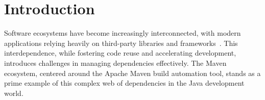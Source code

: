\documentclass[conference]{IEEEtran}
\begin{document}




\maketitle

\begin{abstract}
Regular dependency updates protect dependent software components from upstream bugs, security vulnerabilities, and poor code quality. Measures of dependency updates across software ecosystems involve two key dimensions: the time span during which a release is being newly adopted (adoption lifespan) and the extent of adoption across the ecosystem (adoption reach). We examine correlations between adoption patterns in the Maven software ecosystem and two factors: the magnitude of code modifications (extent of modifications affecting the meaning or behavior of the code, henceforth called ``semantic change") in an upstream dependency and the relative maintenance rate of upstream packages. Using the Goblin Weaver framework, we find adoption latency in the Maven ecosystem follows a log-normal distribution while adoption reach exhibits an exponential decay distribution.

\end{abstract}



%
\IEEEpeerreviewmaketitle



\section{Introduction}

Software ecosystems have become increasingly interconnected, with modern applications relying heavily on third-party libraries and frameworks~\cite{10.1145/3593434.3593474}. This interdependence, while fostering code reuse and accelerating development, introduces challenges in managing dependencies effectively. The Maven ecosystem, centered around the Apache Maven build automation tool, stands as a prime example of this complex web of dependencies in the Java development world.
\end{document}
